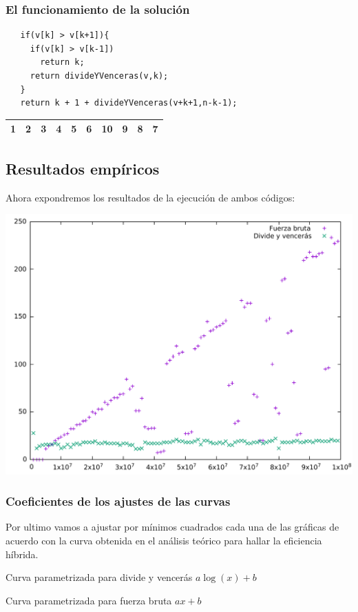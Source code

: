 \documentclass[compress]{beamer}
\begin{document}
\begin{frame}[fragile]
  \frametitle{El funcionamiento de la solución}
  \begin{lstlisting}
   if(v[k] > v[k+1]){
     if(v[k] > v[k-1]) 
       return k;
     return divideYVenceras(v,k);
   }
   return k + 1 + divideYVenceras(v+k+1,n-k-1);
\end{lstlisting}

\begin{center}
  \begin{tabular}{|l|l|l|l|l|l|l|l|l|l|}
\hline
1 & 2 & 3 & 4 & 5 & 6 & 10 & 9 & 8 & 7 \\ \hline
\end{tabular}
\end{center}
\end{frame}



\subsection{Resultados empíricos}
\begin{frame}
	Ahora expondremos los resultados de la ejecución de ambos códigos:\\
	\begin{center}
	\includegraphics[scale=0.37]{imagen1.pdf}
\end{center}
\end{frame}
	
\begin{frame}
\frametitle{Coeficientes de los ajustes de las curvas}
Por ultimo vamos a ajustar por mínimos cuadrados cada una de las gráficas de acuerdo con la curva obtenida en el análisis teórico para hallar la eficiencia híbrida.

\begin{block}{Curva parametrizada para divide y vencerás}
	$a\log(x)+b$
\end{block}

\begin{block}{Curva parametrizada para fuerza bruta}
	$ax+b$
\end{block}
\end{frame}
\end{document}
